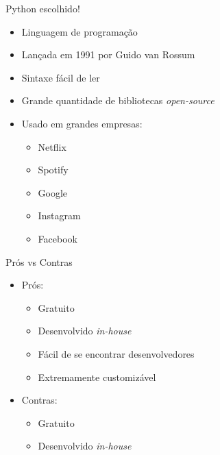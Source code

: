 \documentclass[10pt,t]{beamer}
\begin{document}
\begin{frame}{Python escolhido!}
	\vspace{8pt}
	\begin{itemize}
		\item Linguagem de programação
		\item Lançada em 1991 por Guido van Rossum
		\item Sintaxe fácil de ler
		\item Grande quantidade de bibliotecas \textit{open-source}
		\item Usado em grandes empresas:
		\begin{itemize}
			\item Netflix
			\item Spotify
			\item Google
			\item Instagram
			\item Facebook
		\end{itemize}
	\end{itemize}
\end{frame}

\begin{frame}{Prós vs Contras}
	\vspace{8pt}
	\begin{itemize}
		\item Prós: 
		\begin{itemize}
			\item Gratuito
			\item Desenvolvido \textit{in-house}
			\item Fácil de se encontrar desenvolvedores
			\item Extremamente customizável
		\end{itemize}
	    \item Contras:
	    \begin{itemize}
	    	\item Gratuito %
	    	\item Desenvolvido \textit{in-house} %
	    \end{itemize}
	\end{itemize}
\end{frame}
\end{document}
